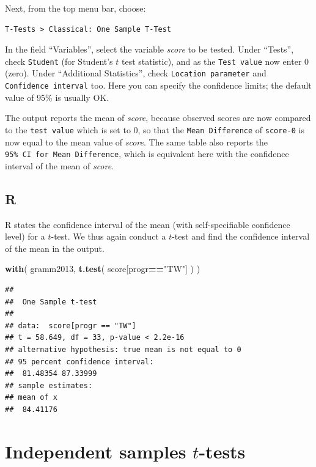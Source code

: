 \documentclass[
]{book}
\newenvironment{Shaded}{\begin{snugshade}}{\end{snugshade}}
\newcommand{\FunctionTok}[1]{\textcolor[rgb]{0.13,0.29,0.53}{\textbf{#1}}}
\newcommand{\NormalTok}[1]{#1}
\newcommand{\SpecialCharTok}[1]{\textcolor[rgb]{0.81,0.36,0.00}{\textbf{#1}}}
\newcommand{\StringTok}[1]{\textcolor[rgb]{0.31,0.60,0.02}{#1}}
\begin{document}
Next, from the top menu bar, choose:

\begin{verbatim}
T-Tests > Classical: One Sample T-Test
\end{verbatim}

In the field ``Variables'', select the variable \emph{score} to be tested.
Under ``Tests'', check \texttt{Student} (for Student's \(t\) test statistic), and as the \texttt{Test\ value} now enter \(0\) (zero).
Under ``Additional Statistics'', check \texttt{Location\ parameter} and \texttt{Confidence\ interval} too. Here you can specify the confidence limits; the default value of 95\% is usually OK.

The output reports the mean of \emph{score}, because observed scores are now compared to the \texttt{test\ value} which is set to \(0\), so that the \texttt{Mean\ Difference} of \texttt{score-0} is now equal to the mean value of \emph{score}. The same table also reports the \texttt{95\%\ CI\ for\ Mean\ Difference}, which is equivalent here with the confidence interval of the mean of \emph{score}.

\hypertarget{r-13}{%
\subsection{R}\label{r-13}}

R states the confidence interval of the mean (with self-specifiable
confidence level) for a \(t\)-test. We thus again conduct a \(t\)-test
and find the confidence interval of the mean in the
output.

\begin{Shaded}
\begin{Highlighting}[]
\FunctionTok{with}\NormalTok{( gramm2013, }\FunctionTok{t.test}\NormalTok{( score[progr}\SpecialCharTok{==}\StringTok{"TW"}\NormalTok{] ) )}
\end{Highlighting}
\end{Shaded}

\begin{verbatim}
## 
##  One Sample t-test
## 
## data:  score[progr == "TW"]
## t = 58.649, df = 33, p-value < 2.2e-16
## alternative hypothesis: true mean is not equal to 0
## 95 percent confidence interval:
##  81.48354 87.33999
## sample estimates:
## mean of x 
##  84.41176
\end{verbatim}

\hypertarget{sec:ttest-indep}{%
\section{\texorpdfstring{Independent samples \(t\)-tests}{Independent samples t-tests}}\label{sec:ttest-indep}}
\end{document}
